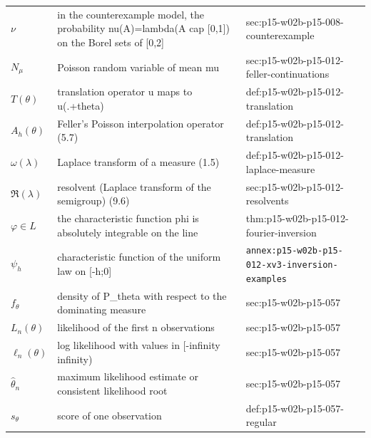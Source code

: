 \begin{longtable}{@{}p{}p{}p{}@{}}
\(\nu\) & in the counterexample model, the probability nu(A)=lambda(A cap [0,1]) on the Borel sets of [0,2] & sec:\allowbreak{}p15-\allowbreak{}w02b-\allowbreak{}p15-\allowbreak{}008-\allowbreak{}counterexample \\
\(N_\mu\) & Poisson random variable of mean mu & sec:\allowbreak{}p15-\allowbreak{}w02b-\allowbreak{}p15-\allowbreak{}012-\allowbreak{}feller-\allowbreak{}continuations \\
\(T(\theta)\) & translation operator u maps to u(.+theta) & def:\allowbreak{}p15-\allowbreak{}w02b-\allowbreak{}p15-\allowbreak{}012-\allowbreak{}translation \\
\(A_h(\theta)\) & Feller's Poisson interpolation operator (5.7) & def:\allowbreak{}p15-\allowbreak{}w02b-\allowbreak{}p15-\allowbreak{}012-\allowbreak{}translation \\
\(\omega(\lambda)\) & Laplace transform of a measure (1.5) & def:\allowbreak{}p15-\allowbreak{}w02b-\allowbreak{}p15-\allowbreak{}012-\allowbreak{}laplace-\allowbreak{}measure \\
\(\mathfrak R(\lambda)\) & resolvent (Laplace transform of the semigroup) (9.6) & sec:\allowbreak{}p15-\allowbreak{}w02b-\allowbreak{}p15-\allowbreak{}012-\allowbreak{}resolvents \\
\(\varphi\in L\) & the characteristic function phi is absolutely integrable on the line & thm:\allowbreak{}p15-\allowbreak{}w02b-\allowbreak{}p15-\allowbreak{}012-\allowbreak{}fourier-\allowbreak{}inversion \\
\(\psi_h\) & characteristic function of the uniform law on [-h;0] & \texttt{annex:\allowbreak{}p15-\allowbreak{}w02b-\allowbreak{}p15-\allowbreak{}012-\allowbreak{}xv3-\allowbreak{}inversion-\allowbreak{}examples} \\
\(f_\theta\) & density of P\_theta with respect to the dominating measure & sec:\allowbreak{}p15-\allowbreak{}w02b-\allowbreak{}p15-\allowbreak{}057 \\
\(L_n(\theta)\) & likelihood of the first n observations & sec:\allowbreak{}p15-\allowbreak{}w02b-\allowbreak{}p15-\allowbreak{}057 \\
\(\ell_n(\theta)\) & log likelihood with values in [-infinity infinity) & sec:\allowbreak{}p15-\allowbreak{}w02b-\allowbreak{}p15-\allowbreak{}057 \\
\(\widehat\theta_n\) & maximum likelihood estimate or consistent likelihood root & sec:\allowbreak{}p15-\allowbreak{}w02b-\allowbreak{}p15-\allowbreak{}057 \\
\(s_\theta\) & score of one observation & def:\allowbreak{}p15-\allowbreak{}w02b-\allowbreak{}p15-\allowbreak{}057-\allowbreak{}regular \\

\end{longtable}
